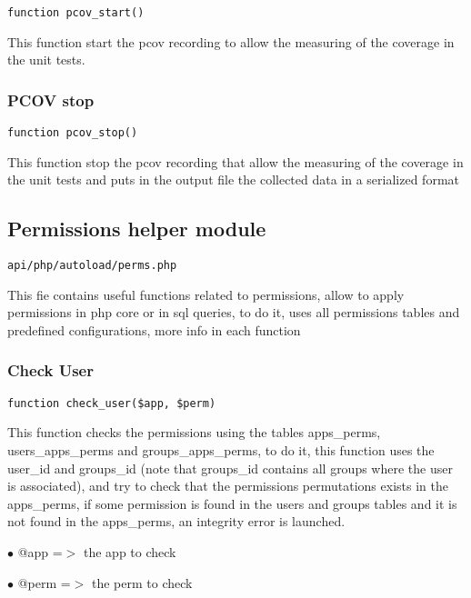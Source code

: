 \documentclass[a4paper]{article}
\begin{document}
\begin{lstlisting}
function pcov_start()
\end{lstlisting}

This function start the pcov recording to allow the measuring of the
coverage in the unit tests.

\hypertarget{toc189}{}
\subsubsection{PCOV stop}

\begin{lstlisting}
function pcov_stop()
\end{lstlisting}

This function stop the pcov recording that allow the measuring of the
coverage in the unit tests and puts in the output file the collected
data in a serialized format

\hypertarget{toc190}{}
\subsection{Permissions helper module}

\begin{lstlisting}
api/php/autoload/perms.php
\end{lstlisting}

This fie contains useful functions related to permissions, allow to apply permissions in php core
or in sql queries, to do it, uses all permissions tables and predefined configurations, more info
in each function

\hypertarget{toc191}{}
\subsubsection{Check User}

\begin{lstlisting}
function check_user($app, $perm)
\end{lstlisting}

This function checks the permissions using the tables apps\_perms,
users\_apps\_perms and groups\_apps\_perms, to do it, this function uses
the user\_id and groups\_id (note that groups\_id contains all groups
where the user is associated), and try to check that the permissions
permutations exists in the apps\_perms, if some permission is found
in the users and groups tables and it is not found in the apps\_perms,
an integrity error is launched.

\begin{compactitem}
\item[\color{myblue}$\bullet$] @app  =$>$ the app to check
\item[\color{myblue}$\bullet$] @perm =$>$ the perm to check
\end{compactitem}
\end{document}
